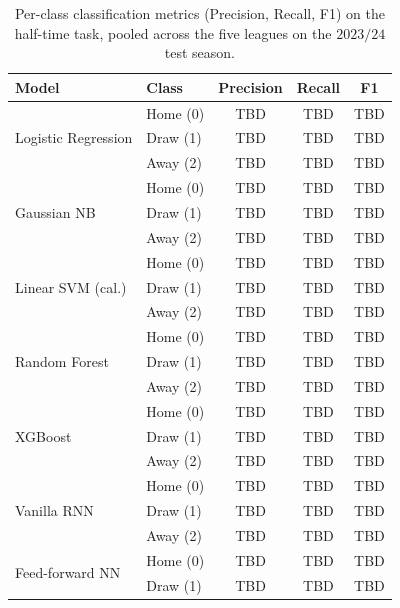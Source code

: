 \documentclass[pdflatex,sn-mathphys-num]{sn-jnl}
\theoremstyle{thmstyleone}
\theoremstyle{thmstyletwo}
\theoremstyle{thmstylethree}
\begin{document}
\begin{table}[h]
\caption{Per-class classification metrics (Precision, Recall, F1) on
the half-time task, pooled across the five leagues on the $2023/24$
test season.}\label{tab:ht-perclass}
\footnotesize
\begin{tabular*}{\textwidth}{@{\extracolsep\fill}llccc@{}}
\toprule
Model & Class & Precision & Recall & F1 \\
\midrule
\multirow{3}{*}{Logistic Regression} & Home (0) & TBD & TBD & TBD \\
                                     & Draw (1) & TBD & TBD & TBD \\
                                     & Away (2) & TBD & TBD & TBD \\
\midrule
\multirow{3}{*}{Gaussian NB}         & Home (0) & TBD & TBD & TBD \\
                                     & Draw (1) & TBD & TBD & TBD \\
                                     & Away (2) & TBD & TBD & TBD \\
\midrule
\multirow{3}{*}{Linear SVM (cal.)}   & Home (0) & TBD & TBD & TBD \\
                                     & Draw (1) & TBD & TBD & TBD \\
                                     & Away (2) & TBD & TBD & TBD \\
\midrule
\multirow{3}{*}{Random Forest}       & Home (0) & TBD & TBD & TBD \\
                                     & Draw (1) & TBD & TBD & TBD \\
                                     & Away (2) & TBD & TBD & TBD \\
\midrule
\multirow{3}{*}{XGBoost}             & Home (0) & TBD & TBD & TBD \\
                                     & Draw (1) & TBD & TBD & TBD \\
                                     & Away (2) & TBD & TBD & TBD \\
\midrule
\multirow{3}{*}{Vanilla RNN}         & Home (0) & TBD & TBD & TBD \\
                                     & Draw (1) & TBD & TBD & TBD \\
                                     & Away (2) & TBD & TBD & TBD \\
\midrule
\multirow{3}{*}{Feed-forward NN}     & Home (0) & TBD & TBD & TBD \\
                                     & Draw (1) & TBD & TBD & TBD \\

\end{tabular*}
\end{table}
\end{document}
